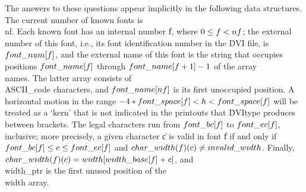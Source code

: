 The answers to these questions appear implicitly in the following data
structures. The current number of known fonts is \\{nf}. Each known font has
an internal number \|f, where $0\L\|f<\\{nf}$; the external number of this
font,
i.e., its font identification number in the \.{DVI} file, is
$\\{font\_num}[\|f]$, and the external name of this font is the string that
occupies positions $\\{font\_name}[\|f]$ through $\\{font\_name}[\|f+1]-1$ of
the array
\\{names}. The latter array consists of \\{ASCII\_code} characters, and
$\\{font\_name}[\\{nf}]$ is its first unoccupied position.  A horizontal motion
in the range $-4\ast\\{font\_space}[\|f]<\|h<\\{font\_space}[\|f]$
will be treated as a `kern' that is not
indicated in the printouts that \.{DVItype} produces between brackets. The
legal characters run from $\\{font\_bc}[\|f]$ to $\\{font\_ec}[\|f]$,
inclusive; more
precisely, a given character \|c is valid in font \|f if and only if
$\\{font\_bc}[\|f]\L\|c\L\\{font\_ec}[\|f]$ and $\\{char\_width}(\|f)(\|c)\I%
\\{invalid\_width}$.
Finally, $\\{char\_width}(\|f)(\|c)=\\{width}[\\{width\_base}[\|f]+\|c]$, and %
\\{width\_ptr} is the
first unused position of the \\{width} array.

